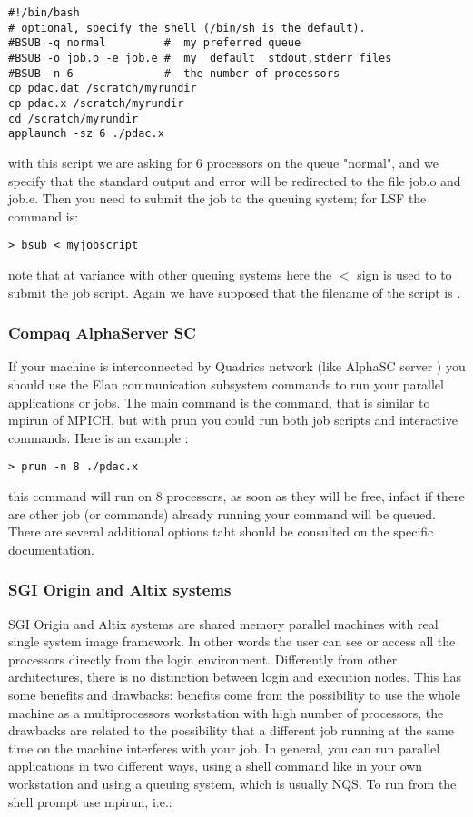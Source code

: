 \begin{verbatim}
#!/bin/bash 
# optional, specify the shell (/bin/sh is the default).
#BSUB -q normal         #  my preferred queue
#BSUB -o job.o -e job.e #  my  default  stdout,stderr files
#BSUB -n 6              #  the number of processors
cp pdac.dat /scratch/myrundir
cp pdac.x /scratch/myrundir
cd /scratch/myrundir
applaunch -sz 6 ./pdac.x
\end{verbatim}

with this script we are asking for 6 processors on the queue "normal",
and we specify that the standard output and error will be redirected 
to the file job.o and job.e. Then you need to
submit the job to the queuing system; for LSF the command is:

\begin{verbatim}
> bsub < myjobscript
\end{verbatim}

note that at variance with other queuing systems here the $<$ sign is used to 
to submit the job script. Again we have supposed that the filename of the script is
.


\subsubsection{Compaq AlphaServer SC}

If your machine is interconnected by Quadrics network (like AlphaSC server )
you should use the 
Elan communication subsystem commands to run your parallel applications
or jobs. The main command is the  command, that is similar
to mpirun of MPICH, but with prun you could run both job scripts
and interactive commands. Here is an example :

\begin{verbatim}
> prun -n 8 ./pdac.x
\end{verbatim}

this command will run  on 8 processors, as soon as they will
be free, infact if there are other job (or commands) already running
your command will be queued.
There are several additional options taht should be consulted on the specific 
documentation.

\subsubsection{SGI Origin and Altix systems}

SGI Origin and Altix systems are shared memory parallel machines with
real single system image framework. In other words the user
can see or access all the processors directly from the 
login environment. Differently from other architectures,
there is no distinction between login and execution nodes.
This has some benefits and drawbacks: benefits come from
the possibility to use the whole machine as a multiprocessors
workstation with high number of processors, the drawbacks
are related to the possibility that a different job running
at the same time on the machine interferes with your job.
In general, you can run parallel applications 
in two different ways, using a shell command like in your own
workstation and using a queuing system, which is usually NQS.
To run from the shell prompt use mpirun, i.e.: 

